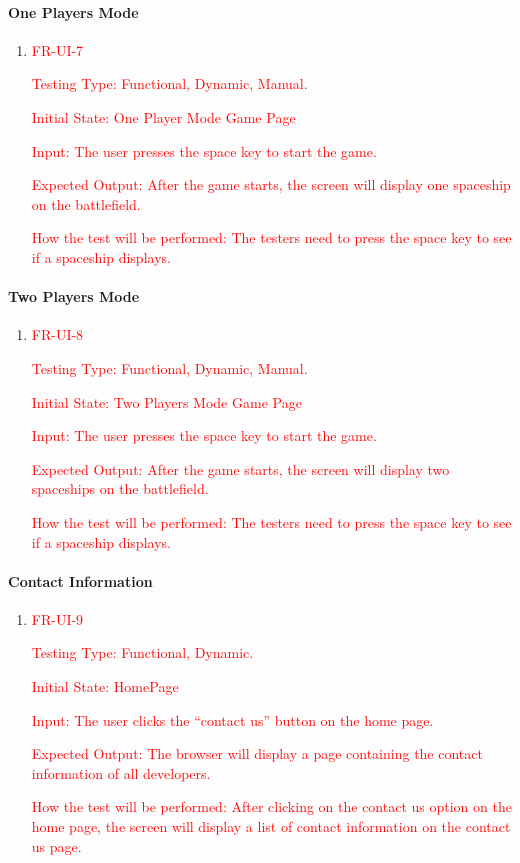 \documentclass[12pt, titlepage]{article}
\begin{document}
\paragraph{One Players Mode}
\begin{enumerate}					
\item{\textcolor{red}{FR-UI-7}\\}

\textcolor{red}{Testing Type: Functional, Dynamic, Manual.}

\textcolor{red}{Initial State: One Player Mode Game Page}

\textcolor{red}{Input: The user presses the space key to start the game.}

\textcolor{red}{Expected Output: After the game starts, the screen will display one
spaceship on the battlefield. }

\textcolor{red}{How the test will be performed: The testers need to press the space
key to see if a spaceship displays.}
\end{enumerate}



\paragraph{Two Players Mode}
\begin{enumerate}					
\item{\textcolor{red}{FR-UI-8}\\}

\textcolor{red}{Testing Type: Functional, Dynamic, Manual.}

\textcolor{red}{Initial State: Two Players Mode Game Page}

\textcolor{red}{Input: The user presses the space key to start the game.}

\textcolor{red}{Expected Output: After the game starts, the screen will display two
spaceships on the battlefield. }

\textcolor{red}{How the test will be performed: The testers need to press the space
key to see if a spaceship displays.}
\end{enumerate}

\paragraph{Contact Information}
\begin{enumerate}					
\item{\textcolor{red}{FR-UI-9}\\}

\textcolor{red}{Testing Type: Functional, Dynamic.}

\textcolor{red}{Initial State: HomePage}

\textcolor{red}{Input: The user clicks the “contact us” button on the home page.}

\textcolor{red}{Expected Output: The browser will display a page containing the contact information of all developers.}

\textcolor{red}{How the test will be performed: After clicking on the contact us option
on the home page, the screen will display a list of contact information
on the contact us page.}
\end{enumerate}
\end{document}
